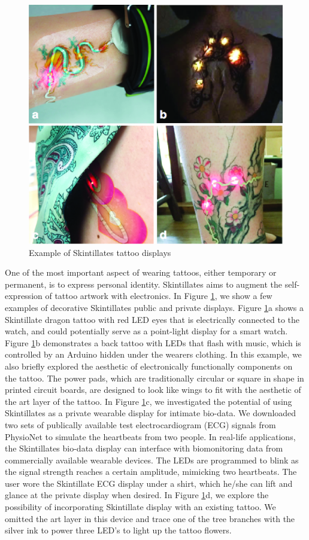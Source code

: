 \documentclass{sigchi}
\begin{document}
\begin{figure}
\centering
\includegraphics[width=1\columnwidth]{figures/Figure6}
\caption{Example of Skintillates tattoo displays}
\vspace{-8pt}
\label{fig:displays}
\end{figure}
One of the most important aspect of wearing tattoos, either temporary or permanent, is to express personal identity. 
Skintillates aims to augment the self-expression of tattoo artwork with electronics. In Figure \ref{fig:displays}, we show a few examples of decorative Skintillates public and private displays. Figure \ref{fig:displays}a shows a Skintillate dragon tattoo with red LED eyes that is electrically connected to the watch, and could potentially serve as a point-light display for a smart watch. Figure \ref{fig:displays}b demonstrates a back tattoo with LEDs that flash with music, which is controlled by an Arduino hidden under the wearers clothing. In this example, we also briefly explored the aesthetic of electronically functionally components on the tattoo. The power pads, which are traditionally circular or square in shape in printed circuit boards, are designed to look like wings to fit with the aesthetic of the art layer of the tattoo. In Figure \ref{fig:displays}c, we investigated the potential of using Skintillates as a private wearable display for intimate bio-data. We downloaded two sets of publically available test electrocardiogram (ECG) signals from PhysioNet to simulate the heartbeats from two people. In real-life applications, the Skintillates bio-data display can interface with biomonitoring data from commercially available wearable devices. The LEDs are programmed to blink as the signal strength reaches a certain amplitude, mimicking two heartbeats. The user wore the Skintillate ECG display under a shirt, which he/she can lift and glance at the private display when desired. In Figure \ref{fig:displays}d, we explore the possibility of incorporating Skintillate display with an existing tattoo. We omitted the art layer in this device and trace one of the tree branches with the silver ink to power three LED’s to light up the tattoo flowers.
\end{document}
